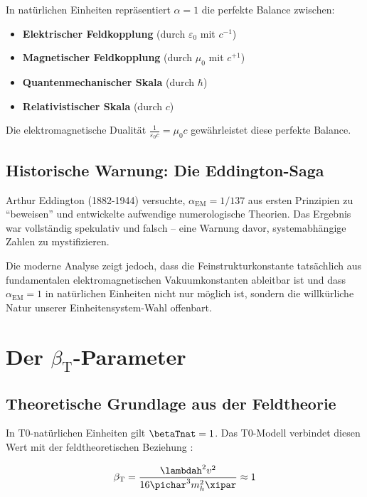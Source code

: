In natürlichen Einheiten repräsentiert $\alpha = 1$ die perfekte Balance zwischen:

\begin{itemize}
	\item \textbf{Elektrischer Feldkopplung} (durch $\varepsilon_0$ mit $c^{-1}$)
	\item \textbf{Magnetischer Feldkopplung} (durch $\mu_0$ mit $c^{+1}$)
	\item \textbf{Quantenmechanischer Skala} (durch $\hbar$)
	\item \textbf{Relativistischer Skala} (durch $c$)
\end{itemize}

Die elektromagnetische Dualität $\frac{1}{\varepsilon_0 c} = \mu_0 c$ gewährleistet diese perfekte Balance.

\subsection{Historische Warnung: Die Eddington-Saga}
\label{subsec:eddington_warning}

Arthur Eddington (1882-1944) versuchte, $\alpha_{\text{EM}} = 1/137$ aus ersten Prinzipien zu ``beweisen'' und entwickelte aufwendige numerologische Theorien. Das Ergebnis war vollständig spekulativ und falsch -- eine Warnung davor, systemabhängige Zahlen zu mystifizieren.

Die moderne Analyse zeigt jedoch, dass die Feinstrukturkonstante tatsächlich aus fundamentalen elektromagnetischen Vakuumkonstanten ableitbar ist und dass $\alpha_{\text{EM}} = 1$ in natürlichen Einheiten nicht nur möglich ist, sondern die willkürliche Natur unserer Einheitensystem-Wahl offenbart.

	\section{Der $\beta_{\text{T}}$-Parameter}
	\label{sec:beta_t}
	
	\subsection{Theoretische Grundlage aus der Feldtheorie}
	\label{subsec:beta_feldtheorie}
	
	In T0-natürlichen Einheiten gilt $\betaTnat = 1$. Das T0-Modell verbindet diesen Wert mit der feldtheoretischen Beziehung \cite{pascher_derivation_beta_2025}:
	
	\begin{equation}
		\beta_{\text{T}} = \frac{\lambdah^2 v^2}{16\pichar^3 m_h^2 \xipar} \approx 1
		\label{eq:beta_t_feldtheorie}
	\end{equation}
	
